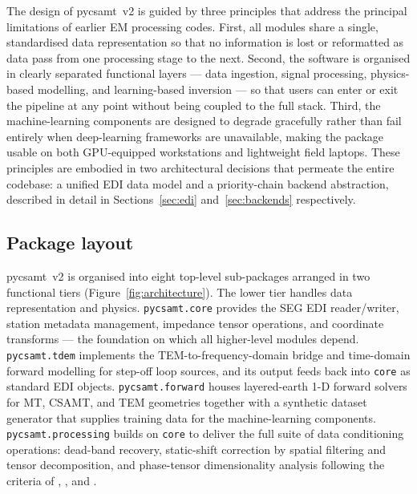 \documentclass[review,12pt]{elsarticle}
\begin{document}
The design of pycsamt~v2 is guided by three principles that address the
principal limitations of earlier EM processing codes.
First, all modules share a single, standardised data representation so that
no information is lost or reformatted as data pass from one processing stage
to the next.
Second, the software is organised in clearly separated functional layers —
data ingestion, signal processing, physics-based modelling, and
learning-based inversion — so that users can enter or exit the pipeline at
any point without being coupled to the full stack.
Third, the machine-learning components are designed to degrade gracefully
rather than fail entirely when deep-learning frameworks are unavailable,
making the package usable on both GPU-equipped workstations and lightweight
field laptops.
These principles are embodied in two architectural decisions that permeate
the entire codebase: a unified EDI data model and a priority-chain backend
abstraction, described in detail in Sections~\ref{sec:edi}
and~\ref{sec:backends} respectively.

\subsection{Package layout}
\label{sec:layout}

pycsamt~v2 is organised into eight top-level sub-packages arranged in
two functional tiers (Figure~\ref{fig:architecture}).
The lower tier handles data representation and physics.
\texttt{pycsamt.core} provides the SEG EDI reader/writer, station metadata
management, impedance tensor operations, and coordinate transforms — the
foundation on which all higher-level modules depend.
\texttt{pycsamt.tdem} implements the TEM-to-frequency-domain bridge and
time-domain forward modelling for step-off loop sources, and its output
feeds back into \texttt{core} as standard EDI objects.
\texttt{pycsamt.forward} houses layered-earth 1-D forward solvers for MT,
CSAMT, and TEM geometries together with a synthetic dataset generator that
supplies training data for the machine-learning components.
\texttt{pycsamt.processing} builds on \texttt{core} to deliver the full
suite of data conditioning operations: dead-band recovery, static-shift
correction by spatial filtering and tensor decomposition, and phase-tensor
dimensionality analysis following the criteria of \citet{Swift1969},
\citet{Bahr1991}, and \citet{Caldwell2004}.
\end{document}
